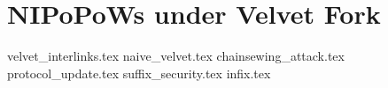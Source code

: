 \section{NIPoPoWs under Velvet Fork}

{velvet_interlinks.tex}
{naive_velvet.tex}
{chainsewing_attack.tex}
{protocol_update.tex}
{suffix_security.tex}
{infix.tex}
